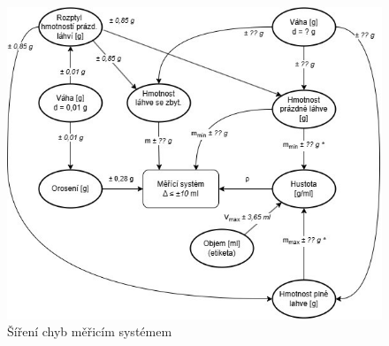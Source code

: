 

\begin{figure}[H]
    \begin{center}
        \includegraphics[scale=0.9]{obrazky/Propagace nejistot-Metoda1++.jpg}
    \end{center}
    \caption{Šíření chyb měřicím systémem}
    \label{chyby}
\end{figure}

